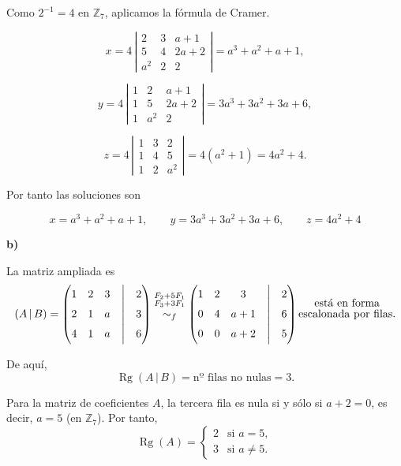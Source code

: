 \documentclass[a4paper,12pt]{article}
\begin{document}
\begin{ejercicio}[title=Ejercicio 30]
Como \(2^{-1}=4\) en \(\mathbb{Z}_7\), aplicamos la fórmula de Cramer.

\[
x = 4\,
\left|
\begin{matrix}
2 & 3 & a+1\\
5 & 4 & 2a+2\\
a^2 & 2 & 2
\end{matrix}
\right|
= a^3 + a^2 + a + 1,
\]

\[
y = 4\,
\left|
\begin{matrix}
1 & 2 & a+1\\
1 & 5 & 2a+2\\
1 & a^2 & 2
\end{matrix}
\right|
= 3a^3 + 3a^2 + 3a + 6,
\]

\[
z = 4\,
\left|
\begin{matrix}
1 & 3 & 2\\
1 & 4 & 5\\
1 & 2 & a^2
\end{matrix}
\right|
= 4(a^2+1)
= 4a^2 + 4.
\]

Por tanto las soluciones son

\[
\boxed{\,x = a^3 + a^2 + a + 1,\qquad
y = 3a^3 + 3a^2 + 3a + 6,\qquad
z = 4a^2 + 4\,}
\]

\vspace{1em}

\textbf{b)}

La matriz ampliada es
\[
(A\,|\,B)=
\begin{pmatrix}
1 & 2 & 3 &\Big|& 2\\
2 & 1 & a &\Big|& 3\\
4 & 1 & a &\Big|& 6
\end{pmatrix}
\overset{\substack{F_2+5F_1\\ F_3+3F_1\\{}}}{\sim_f}
\begin{pmatrix}
1 & 2 & 3 &\Big|& 2\\
0 & 4 & a+1 &\Big|& 6\\
0 & 0 & a+2 &\Big|& 5
\end{pmatrix}
\text{\shortstack{ está en forma\\ escalonada por filas.}}
\]

De aquí,
\[
\operatorname{Rg}(A\,|\,B)=\text{nº filas no nulas}=3.
\]

Para la matriz de coeficientes \(A\), la tercera fila es nula si y sólo si
\(a+2=0\), es decir, \(a=5\) (en \(\mathbb{Z}_7\)). Por tanto,
\[
\operatorname{Rg}(A)=
\begin{cases}
2 & \text{si } a=5,\\
3 & \text{si } a\neq 5.
\end{cases}
\]


\end{ejercicio}
\end{document}

